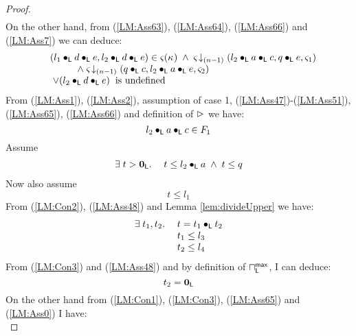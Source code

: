 \begin{lemma}[]
\begin{proof}
\begin{align}
\end{align}
%
On the other hand, from (\ref{LM:Ass63}), (\ref{LM:Ass64}), (\ref{LM:Ass66}) and (\ref{LM:Ass7}) we can deduce:
%
\begin{align}
	\begin{array}{l l}
		&(l_1 \bullet_{\textsf{L}} d \bullet_{\textsf{L}} e, l_2 \bullet_{\textsf{L}} d \bullet_{\textsf{L}} e) \in \varsigma_{}(\kappa_{}) \;\land\;
		\varsigma_{} \!\downarrow_{(n-1)} \left(l_2 \bullet_{\textsf{L}} a \bullet_{\textsf{L}} c, q \bullet_{\textsf{L}} e, \varsigma_{1}\right)\\
		& \hspace*{1cm}\land\; \varsigma_{} \!\downarrow_{(n-1)} \left(q \bullet_{\textsf{L}} c, l_2 \bullet_{\textsf{L}} a \bullet_{\textsf{L}} e, \varsigma_{2}\right)\\
		& \;\lor (l_2 \bullet_{\textsf{L}} d \bullet_{\textsf{L}} e)\hspace*{0.2cm}\text{is undefined}
	\end{array} \label{LM:Ass67}
\end{align}
From (\ref{LM:Ass1}), (\ref{LM:Ass2}), assumption of case 1, (\ref{LM:Ass47})-(\ref{LM:Ass51}), (\ref{LM:Ass65}), (\ref{LM:Ass66})  and definition of $\rhd$ we have:
%
\begin{equation}
	l_2 \bullet_{\textsf{L}} a \bullet_{\textsf{L}} c \in F_1 \label{LM:Ass68}
\end{equation}
%
Assume 
%
\begin{align}
	\begin{array}{l l}
		\exists\; t > \mathbf{0}_{\textsf{L}}.\; & t \leq l_2 \bullet_{\textsf{L}} a \;\land\; t \leq q
	\end{array} \label{LM:Con1}
\end{align}
%
Now also assume 
\begin{equation}
	t \leq l_1 \label{LM:Con2}
\end{equation}
%
From (\ref{LM:Con2}), (\ref{LM:Ass48}) and Lemma \ref{lem:divideUpper} we have:
%
\begin{align}
	\begin{array}{l l}
		\exists\; t_1, t_2.\; & t = t_1 \bullet_{\textsf{L}} t_2\\
		& t_1 \leq l_3\\
		& t_2 \leq l_4
	\end{array} \label{LM:Con3}
\end{align}
%
From (\ref{LM:Con3}) and (\ref{LM:Ass48}) and by definition of $\sqcap_{\textsf{L}}^{\textsf{max}}$, I can deduce: 
%
\begin{equation}
	t_2 = \mathbf{0}_{\textsf{L}} \label{LM:Con4}
\end{equation}
%
On the other hand from (\ref{LM:Con1}), (\ref{LM:Con3}), (\ref{LM:Ass65}) and (\ref{LM:Ass0}) I have: 
%
\begin{equation}

\end{equation}
\end{proof}
\end{lemma}
